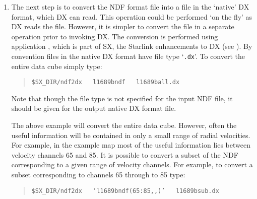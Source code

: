 \begin{enumerate}
   Again the file name is specified without the `{\tt .sdf}' file type.
   This application lists the history information describing the
   processing which has been performed on the data.  The history
   information appended by {\tt specx2ndf} includes details of the way
   in which the spectral axis was computed.  It is also possible to
   inspect the structure of the data set using {\tt hdstrace}.  Simply
   type:

  \begin{quote}
   {\tt hdstrace ~ l1689bndf}
  \end{quote}

   As usual the file name is specified without the `{\tt .sdf}' file type.
   This facility is useful because it lists the value of much of the
   auxiliary information contained in the data set.  {\tt hdstrace}
   is documented in \cite{SUN102}.  In addition
   {\tt hdstrace} will also work on the original SPECX map.

  \item The next step is to convert the NDF format file into a file
   in the `native' DX format, which DX can read.  This operation
   could be performed `on the fly' as DX reads the file.  However, it
   is simpler to convert the file in a separate operation prior to
   invoking DX.  The conversion is performed using application
   , which is part of SX, the
   Starlink enhancements to DX (see \cite{SUN203}).
   By convention files in the native DX format have file type `{\tt .dx}'.
   To convert the entire data cube simply type:

  \begin{quote}
   {\tt \$SX\_DIR/ndf2dx ~ l1689bndf ~ l1689ball.dx}
  \end{quote}

   Note that though the file type is not specified for the input NDF
   file, it should be given for the output native DX format file.

   The above example will convert the entire data cube.  However, often
   the useful information will be contained in only a small range of
   radial velocities.  For example, in the example map most of the
   useful information lies between velocity channels 65 and 85.  It is
   possible to convert a subset of the NDF corresponding to a given
   range of velocity channels.  For example, to convert a subset
   corresponding to channels 65 through to 85 type:

  \begin{quote}
   {\tt \$SX\_DIR/ndf2dx ~ 'l1689bndf(65:85,,)' ~ l1689bsub.dx}
  \end{quote}


\end{enumerate}
